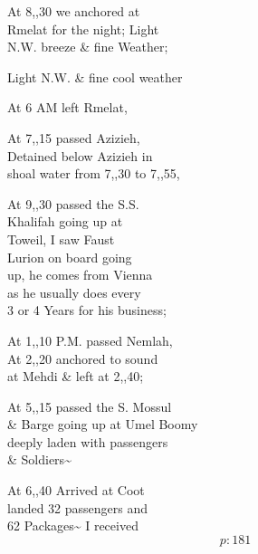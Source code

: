 \documentclass{report}
\begin{document}
	\par{
 	At 8,,30 we anchored at\ \\Rmelat for the night; Light\ \\N.W. breeze \& fine Weather;\ \\
	}

	\par{
 	Light N.W. \& fine cool weather\ \\
	}

	\par{
 	At 6 AM left Rmelat,\ \\
	}

	\par{
 	At 7,,15 passed Azizieh,\ \\Detained below Azizieh in\ \\shoal water from 7,,30 to 7,,55,\ \\
	}

	\par{
 	At 9,,30 passed the S.S.\ \\Khalifah going up at\ \\Toweil, I saw Faust\ \\Lurion on board going\ \\up, he comes from Vienna\ \\as he usually does every\ \\3 or 4 Years for his business;\ \\
	}

	\par{
 	At 1,,10 P.M. passed Nemlah,\ \\At 2,,20 anchored to sound\ \\at Mehdi \& left at 2,,40;\ \\
	}

	\par{
 	At 5,,15 passed the S. Mossul\ \\\& Barge going up at Umel Boomy\ \\deeply laden with passengers\ \\\& Soldiers\~{}\ \\
	}

	\par{
 	At 6,,40 Arrived at Coot\ \\landed 32 passengers and\ \\62 Packages\~{} I received\ \\
  \[p: 181 \]

	}

\end{document}
